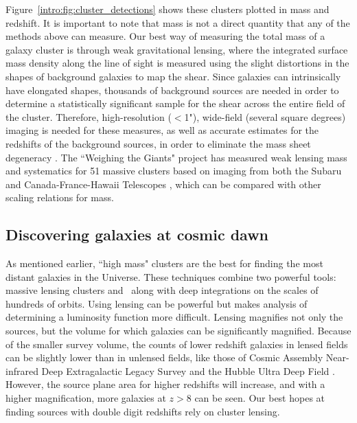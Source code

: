 Figure~\ref{intro:fig:cluster_detections} shows these clusters plotted in mass and redshift. It is important to note that mass is not a direct quantity that any of the methods above can measure. Our best way of measuring the total mass of a galaxy cluster is through weak gravitational lensing, where the integrated surface mass density along the line of sight is measured using the slight distortions in the shapes of background galaxies to map the shear. Since galaxies can intrinsically have elongated shapes, thousands of background sources are needed in order to determine a statistically significant sample for the shear across the entire field of the cluster. Therefore, high-resolution ($<$1"), wide-field (several square degrees) imaging is needed for these measures, as well as accurate estimates for the redshifts of the background sources, in order to eliminate the mass sheet degeneracy \citep{Schneider:1995vn}. The ``Weighing the Giants" project has measured weak lensing mass and systematics for 51 massive clusters based on imaging from both the Subaru and Canada-France-Hawaii Telescopes \citep{von-der-Linden:2014wd}, which can be compared with other scaling relations for mass.

\subsection{Discovering galaxies at cosmic dawn}

As mentioned earlier, ``high mass" clusters are the best for finding the most distant galaxies in the Universe. These techniques combine two powerful tools: massive lensing clusters and \hst\ along with deep integrations on the scales of hundreds of orbits. Using lensing can be powerful but makes analysis of determining a luminosity function more difficult. Lensing magnifies not only the sources, but the volume for which galaxies can be significantly magnified. Because of the smaller survey volume, the counts of lower redshift galaxies in lensed fields can be slightly lower than in unlensed fields, like those of Cosmic Assembly Near-infrared Deep Extragalactic Legacy Survey \citep[CANDELS; ][]{Grogin:2011ly} and the Hubble Ultra Deep Field \citep{Beckwith:2006rt}. However, the source plane area for higher redshifts will increase, and with a higher magnification, more galaxies at $z>8$ can be seen. Our best hopes at finding sources with double digit redshifts rely on cluster lensing.

